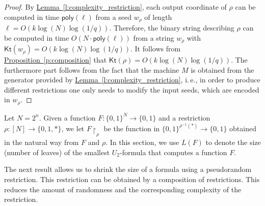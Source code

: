 \documentclass[11pt]{article}
\numberwithin{equation}{section}
\theoremstyle{definition}
\theoremstyle{plain}
\newcommand{\ie}{i.\,e.}
\newcommand{\expref}[2]{\hyperref[#2]{#1~\ref{#2}}}
\newcommand{\Kt}{\mathsf{Kt}}
\begin{document}
\begin{proof}
By \expref{Lemma}{l:complexity_restriction}, each output coordinate of $\rho$ can be computed in time $\mathsf{poly}(\ell)$ from a seed $w_\rho$ of length $\ell = O(k \log (N) \log (1/q))$. Therefore, the binary string describing $\rho$ can be computed in time $O(N \cdot \mathsf{poly}(\ell))$ from a string $w_\rho$ with $\Kt(w_\rho) = O(k \log (N) \log (1/q))$. It follows from \expref{Proposition}{p:composition} that $\Kt(\rho) = O(k \log (N) \log (1/q))$. The furthermore part follows from the fact that the machine $M$ is obtained from the generator provided by \expref{Lemma}{l:complexity_restriction}, \ie, in order to produce different restrictions one only needs to modify the input seeds, which are encoded in $w_\rho$.
\end{proof}

Let $N = 2^n$. Given a function $F \colon \{0,1\}^N \to \{0,1\}$ and a restriction $\rho \colon [N] \to \{0,1,*\}$, we let $F\!\upharpoonright_\rho$ be the function in $\{0,1\}^{\rho^{-1}(*)} \to \{0,1\}$ obtained in the natural way from $F$ and $\rho$. In this section, we use $L(F)$ to denote the size (number of leaves) of the smallest $U_2$-formula that computes a function $F$. 

The next result allows us to shrink the size of a formula using a pseudorandom restriction. This restriction can be obtained by a composition of restrictions. This reduces the amount of randomness and the corresponding complexity of the restriction. 
\end{document}
